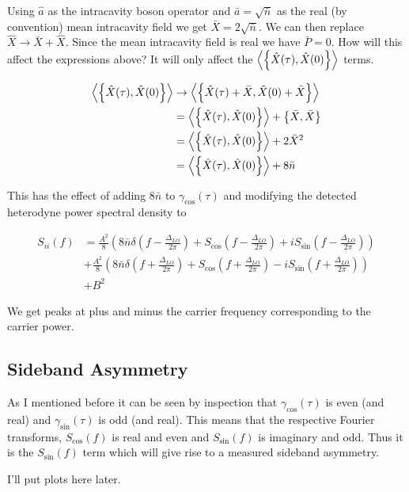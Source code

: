 \documentclass[12pt]{article}
\begin{document}
Using $\hat{a}$ as the intracavity boson operator and $\bar{a} = \sqrt{\bar{n}}$ as the real (by convention) mean intracavity field we get $\bar{X} = 2\sqrt{\bar{n}}$. We can then replace $\hat{X} \rightarrow \bar{X} + \hat{X}$. Since the mean intracavity field is real we have $\bar{P} = 0$. How will this affect the expressions above? It will only affect the $\Braket{\left\{\hat{X}(\tau),\hat{X}(0) \right\}}$ terms.

\begin{align}
\Braket{\left\{\hat{X}(\tau),\hat{X}(0) \right\}} &\rightarrow \Braket{\left\{\hat{X}(\tau) +\bar{X},\hat{X}(0)+\bar{X} \right\}}\\
&=\Braket{\left\{\hat{X}(\tau),\hat{X}(0) \right\}} + \left\{\bar{X},\bar{X} \right\}\\
&=\Braket{\left\{\hat{X}(\tau),\hat{X}(0) \right\}} + 2\bar{X}^2\\
&=\Braket{\left\{\hat{X}(\tau),\hat{X}(0) \right\}} + 8\bar{n}
\end{align}

This has the effect of adding $8 \bar{n}$ to $\gamma_{\cos}(\tau)$ and modifying the detected heterodyne power spectral density to

\begin{align}
S_{ii}(f) &= \frac{A^2}{8} \left(8\bar{n}\delta\left(f-\frac{\Delta_{LO}}{2\pi}\right) + S_{\cos}\left(f-\frac{\Delta_{LO}}{2\pi}\right) + iS_{\sin}\left(f-\frac{\Delta_{LO}}{2\pi}\right)\right)\\
&+ \frac{A^2}{8} \left(8\bar{n}\delta\left(f+\frac{\Delta_{LO}}{2\pi}\right) + S_{\cos}\left(f+\frac{\Delta_{LO}}{2\pi}\right) - iS_{\sin}\left(f+\frac{\Delta_{LO}}{2\pi}\right)\right)\\
&+B^2
\end{align}

We get peaks at plus and minus the carrier frequency corresponding to the carrier power.

\subsection{Sideband Asymmetry}
As I mentioned before it can be seen by inspection that $\gamma_{\cos}(\tau)$ is even (and real) and $\gamma_{\sin}(\tau)$ is odd (and real). This means that the respective Fourier transforms, $S_{\cos}(f)$ is real and even and $S_{\sin}(f)$ is imaginary and odd. Thus it is the $S_{\sin}(f)$ term which will give rise to a measured sideband asymmetry.

I'll put plots here later.
\end{document}
